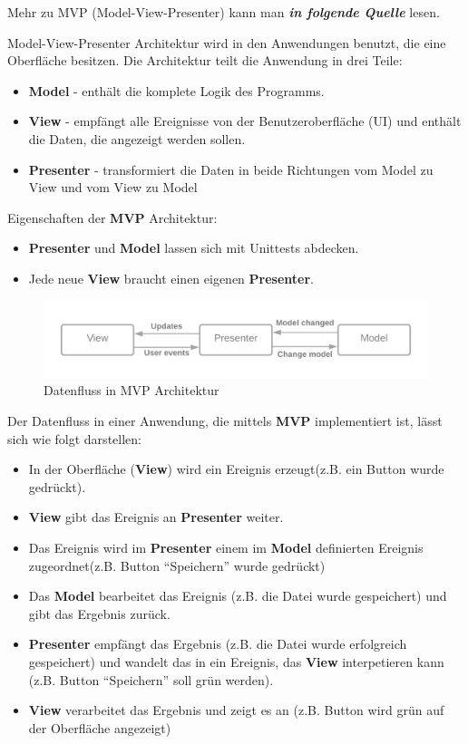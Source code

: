 Mehr zu MVP (Model-View-Presenter) kann man \textit{\textbf{in folgende Quelle}} lesen.

Model-View-Presenter Architektur wird in den Anwendungen benutzt, die eine Oberfläche besitzen.
Die Architektur teilt die Anwendung in drei Teile:
\begin{itemize}
    \item \textbf{Model} - enthält die komplete Logik des Programms.
    \item \textbf{View} - empfängt alle Ereignisse von der Benutzeroberfläche (UI) und enthält die Daten, die angezeigt werden sollen.
    \item \textbf{Presenter} - transformiert die Daten in beide Richtungen vom Model zu View 
    und vom View zu Model
\end{itemize}


Eigenschaften der \textbf{MVP} Architektur:
\begin{itemize}
    \item \textbf{Presenter} und \textbf{Model} lassen sich mit Unittests abdecken.
    \item Jede neue \textbf{View} braucht einen eigenen \textbf{Presenter}.
\end{itemize}

\begin{figure}[H]
    \centering
    \includegraphics[width=1\textwidth]{./images/MVP.png}
    \caption[Datenfluss in MVP Architektur]{Datenfluss in MVP Architektur}
    \label{fig:MVP}
\end{figure}

Der Datenfluss in einer Anwendung, die mittels \textbf{MVP} implementiert ist, lässt sich wie folgt darstellen:
\begin{itemize}
    \item In der Oberfläche (\textbf{View}) wird ein Ereignis erzeugt(z.B. ein Button wurde gedrückt).
    \item \textbf{View} gibt das Ereignis an \textbf{Presenter} weiter.
    \item Das Ereignis wird im \textbf{Presenter} einem im \textbf{Model} definierten Ereignis zugeordnet(z.B. Button ``Speichern'' wurde gedrückt)
    \item Das \textbf{Model} bearbeitet das Ereignis (z.B. die Datei wurde gespeichert) und gibt das Ergebnis zurück.
    \item \textbf{Presenter} empfängt das Ergebnis (z.B. die Datei wurde erfolgreich gespeichert) und wandelt das in ein Ereignis,
    das \textbf{View} interpetieren kann (z.B. Button ``Speichern'' soll grün werden).
    \item \textbf{View} verarbeitet das Ergebnis und zeigt es an (z.B. Button wird grün auf der Oberfläche angezeigt)
\end{itemize}